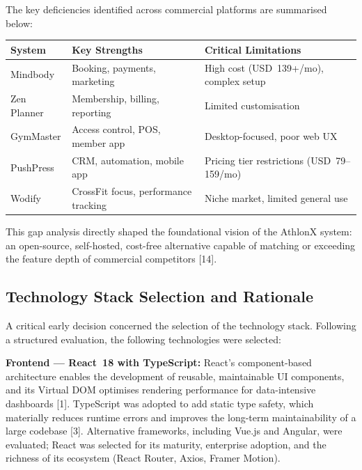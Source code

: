 \documentclass[
  12pt,
  a4paperpaper,
]{report}
\begin{document}
The key deficiencies identified across commercial platforms are
summarised below:

\vspace{4pt}
\noindent\begin{tabularx}{\textwidth}{|p{3.5cm}|p{4.0cm}|X|}
\hline
\textbf{System} & \textbf{Key Strengths} & \textbf{Critical Limitations} \\
\hline

Mindbody & Booking, payments, marketing & High cost (USD~139+/mo), complex setup \\[3pt]
\hline
Zen Planner & Membership, billing, reporting & Limited customisation \\[3pt]
\hline
GymMaster & Access control, POS, member app & Desktop-focused, poor web UX \\[3pt]
\hline
PushPress & CRM, automation, mobile app & Pricing tier restrictions (USD~79--159/mo) \\[3pt]
\hline
Wodify & CrossFit focus, performance tracking & Niche market, limited general use \\
\hline
\end{tabularx}
\vspace{4pt}

This gap analysis directly shaped the foundational vision of the
AthlonX system: an open-source, self-hosted, cost-free alternative
capable of matching or exceeding the feature depth of commercial
competitors {[}14{]}.

\subsection{Technology Stack Selection and
Rationale}\label{technology-stack-rationale}

A critical early decision concerned the selection of the technology
stack. Following a structured evaluation, the following technologies
were selected:

\textbf{Frontend --- React~18 with TypeScript:} React's
component-based architecture enables the development of reusable,
maintainable UI components, and its Virtual DOM optimises rendering
performance for data-intensive dashboards {[}1{]}.
TypeScript was adopted to add static type safety, which materially
reduces runtime errors and improves the long-term maintainability of
a large codebase {[}3{]}. Alternative frameworks, including
Vue.js and Angular, were evaluated; React was selected for its
maturity, enterprise adoption, and the richness of its ecosystem
(React Router, Axios, Framer Motion).
\end{document}
